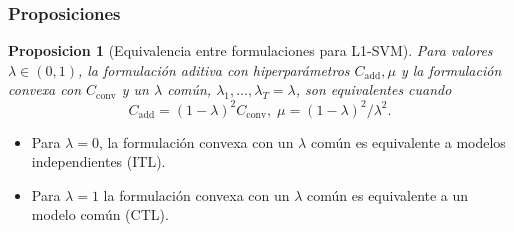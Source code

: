 \documentclass[aspectratio=43]{beamer}
\newtheorem{proposition}[theorem]{Proposicion}
\newcommand{\ntasks}{T}
\begin{document}
\begin{frame}
      \frametitle{Proposiciones}

      \begin{proposition}[Equivalencia entre formulaciones para L1-SVM]
            Para valores $\lambda \in (0, 1)$, la formulación aditiva con hiperparámetros $C_\text{add}, \mu$ y la formulación convexa con $C_\text{conv}$ y un $\lambda$ común, $\lambda_1, \ldots, \lambda_\ntasks = \lambda$, son equivalentes cuando
            $$C_\text{add} = (1 - \lambda)^2 C_\text{conv}, \; \mu = (1 - \lambda)^2 / \lambda^2 .$$ 
      \end{proposition}

      \begin{itemize}
            \item Para $\lambda = 0$, la formulación convexa con un $\lambda$ común es equivalente a modelos independientes (ITL).
            \item Para $\lambda = 1$ la formulación convexa con un $\lambda$ común es equivalente a un modelo común (CTL).
      \end{itemize}
     

\end{frame}
\end{document}

